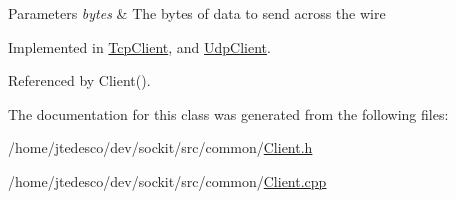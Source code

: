 \begin{DoxyParams}{Parameters}
{\em bytes} & The bytes of data to send across the wire \\
\hline
\end{DoxyParams}


Implemented in \hyperlink{classTcpClient_a1d749cbc2e255d8d3204dfd2d2c58d5f}{TcpClient}, and \hyperlink{classUdpClient_ad55f42a3c5cb3698b49975c8a065079e}{UdpClient}.



Referenced by Client().



The documentation for this class was generated from the following files:\begin{DoxyCompactItemize}
\item 
/home/jtedesco/dev/sockit/src/common/\hyperlink{Client_8h}{Client.h}\item 
/home/jtedesco/dev/sockit/src/common/\hyperlink{Client_8cpp}{Client.cpp}\end{DoxyCompactItemize}
